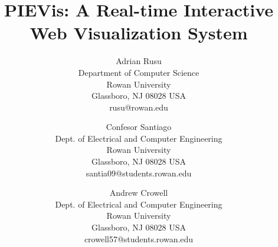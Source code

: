 \documentclass[]{article}
\begin{document}
\newif \iffull \fulltrue

%
%

%


\title {PIEVis: A Real-time Interactive Web Visualization System}

\author{Adrian Rusu\\
        Department of Computer Science\\
        Rowan University\\
        Glassboro, NJ 08028 USA\\
        rusu@rowan.edu
\and
        Confesor Santiago\\
        Dept. of Electrical and Computer Engineering\\
        Rowan University\\
        Glassboro, NJ 08028 USA\\
        santia09@students.rowan.edu
\and
        Andrew Crowell\\
        Dept. of Electrical and Computer Engineering\\
        Rowan University\\
        Glassboro, NJ 08028 USA\\
        crowell57@students.rowan.edu}


\date{}
\end{document}
